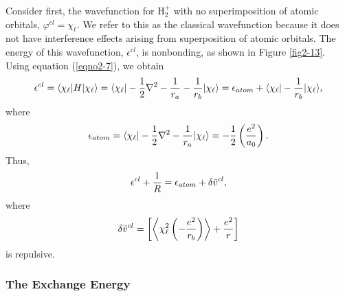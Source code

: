     
Consider first, the wavefunction for H$^+_2$ with no superimposition
of atomic orbitals, $\varphi^{cl} = \chi_{\ell}$.  We refer to this as
the classical wavefunction because it does not have interference
effects arising from superposition of atomic orbitals. The energy of
this wavefunction, $\epsilon^{cl}$, is nonbonding, as shown in Figure
\ref{fig2-13}.  Using equation (\ref{eqno2-7}), we obtain
\begin{equation}
\epsilon^{cl} = \langle \chi_{\ell} \vert H \vert \chi_{\ell}\rangle = 
\langle \chi_{\ell} \vert - {1 \over 2} \nabla^2 - {1 \over r_a} - 
{1 \over r_b} \vert \chi_{\ell} \rangle = \epsilon_{atom} + \langle 
\chi_{\ell} \vert - {1 \over r_b} \vert \chi_{\ell} \rangle,
\end{equation}
where
\begin{equation}
\epsilon_{atom} = \langle \chi_{\ell} \vert - {1 \over 2} \nabla^2 - 
{1 \over r_a} \vert \chi_{\ell} \rangle = - {1 \over 2} \left( {e^2 
\over a_0} \right).
\end{equation}
Thus,
\begin{equation}
\epsilon^{cl} + {1 \over R} = \epsilon_{atom} + \delta {\bar v}^{cl},
\end{equation}
where
\begin{equation}
\delta {\bar v}^{cl} = \left[\left\langle \chi^2_{\ell} \left( - {e^2 
\over r_b} \right)\right\rangle  + {e^2 \over r} \right]
\end{equation}
is repulsive.

\subsubsection{The Exchange Energy}
    
